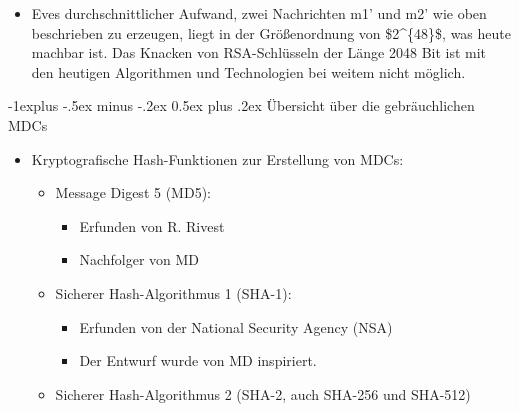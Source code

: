 \documentclass[a4paper]{article}
\makeatletter
\renewcommand{\subsection}{\@startsection{subsection}{2}{0mm}%
 {-1explus -.5ex minus -.2ex}%
 {0.5ex plus .2ex}%
 {\normalfont\normalsize\bfseries}}
\makeatother
\begin{document}
\begin{multicols}{3}
\begin{itemize}
              \begin{itemize}
                  \item
                        Eves durchschnittlicher Aufwand, zwei Nachrichten m1' und m2' wie
                        oben beschrieben zu erzeugen, liegt in der Größenordnung von
                        \$2\^{}\{48\}\$, was heute machbar ist. Das Knacken von
                        RSA-Schlüsseln der Länge 2048 Bit ist mit den heutigen Algorithmen
                        und Technologien bei weitem nicht möglich.
              \end{itemize}
    \end{itemize}


    \subsection{Übersicht über die gebräuchlichen
        MDCs}

    \begin{itemize}
        \item
              Kryptografische Hash-Funktionen zur Erstellung von MDCs:

              \begin{itemize}
                  \item
                        Message Digest 5 (MD5):

                        \begin{itemize}
                            \item
                                  Erfunden von R. Rivest
                            \item
                                  Nachfolger von MD
                        \end{itemize}
                  \item
                        Sicherer Hash-Algorithmus 1 (SHA-1):

                        \begin{itemize}
                            \item
                                  Erfunden von der National Security Agency (NSA)
                            \item
                                  Der Entwurf wurde von MD inspiriert.
                        \end{itemize}
                  \item
                        Sicherer Hash-Algorithmus 2 (SHA-2, auch SHA-256 und SHA-512)


\end{itemize}
\end{itemize}
\end{multicols}
\end{document}

